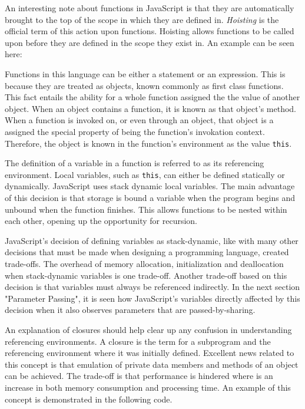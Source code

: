 \documentclass[man]{apa}
\begin{document}
An interesting note about functions in JavaScript is that they are automatically brought to the top of the scope in which they are defined in. \textit{Hoisting} is the official term of this action upon functions. Hoisting allows functions to be called upon before they are defined in the scope they exist in. An example can be seen here:




Functions in this language can be either a statement or an expression. This is because they are treated as objects, known commonly as first class functions. This fact entails the ability for a whole function assigned the the value of another object. When an object contains a function, it is known as that object's method. When a function is invoked on, or even through an object, that object is a assigned the special property of being the function's invokation context. Therefore, the object is known in the function's environment as the value \texttt{this}.

The definition of a variable in a function is referred to as its referencing environment. Local variables, such as \texttt{this}, can either be defined statically or dynamically. JavaScript uses stack dynamic local variables. The main advantage of this decision is that storage is bound a variable when the program begins and unbound when the function finishes. This allows functions to be nested within each other, opening up the opportunity for recursion. 

JavaScript's decision of defining variables as stack-dynamic, like with many other decisions that must be made when designing a programming language, created trade-offs. The overhead of memory allocation, initialization and deallocation when stack-dynamic variables is one trade-off. Another trade-off based on this decision is that variables must always be referenced indirectly. In the next section "Parameter Passing", it is seen how JavaScript's variables directly affected by this decision when it also observes parameters that are passed-by-sharing.

An explanation of closures should help clear up any confusion in understanding referencing environments. A closure is the term for a subprogram and the referencing environment where it was initially defined. Excellent news related to this concept is that emulation of private data members and methods of an object can be achieved. The trade-off is that performance is hindered where is an increase in both memory consumption and processing time. An example of this concept is demonstrated in the following code.
\end{document}

